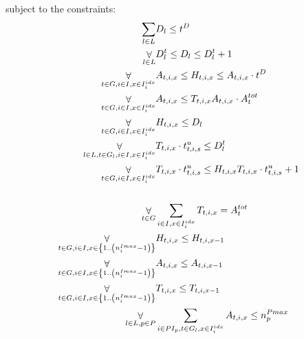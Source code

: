 {   subject to the constraints:
   \nopagebreak 
   \begin{align}
       \label{cLayerDeadline} \mathop\sum\limits_{l \in \LAYER} & \LayerDeadline_l \leq \workflowDeadline
       \\
       \label{cLayerTime}     \mathop\forall\limits_{l \in \LAYER} & \LayerTime_l \leq \LayerDeadline_l \leq \LayerTime_l + 1
       \\
       \label{cInstancesActiveHours} \mathop\forall\limits_{t \in \TASK, i \in \INSTANCE, x \in \instanceSet_i} & 
         \InstanceActive_{t,i,x} \leq \InstanceHours_{t,i,x} \leq  \InstanceActive_{t,i,x} \cdot \workflowDeadline
       \\
       \label{cInstancesActiveTasks} \mathop\forall\limits_{t \in \TASK, i \in \INSTANCE, x \in \instanceSet_i} &
         \InstanceActive_{t,i,x} \leq \InstanceTasks_{t,i,x} \InstanceActive_{t,i,x} \cdot \taskCount_t
       \\
       \label{cEnsureLayerDeadline} \mathop\forall\limits_{t \in \TASK, i \in \INSTANCE, x \in \instanceSet_i} &
         \InstanceHours_{t,i,x} \leq \LayerDeadline_l
       \\ 
       \label{cEnsureLayerTime} \mathop\forall\limits_{l \in \LAYER, t \in \TASK_l, i \in \INSTANCE, x \in \instanceSet_i} &
         \InstanceTasks_{t,i,x} \cdot \unitTime_{t,i,s} \leq \LayerTime_l
       \\       
       \label{cEnoughProcessingPower} \mathop\forall\limits_{t \in \TASK, i \in \INSTANCE, x \in \instanceSet_i} &
         \InstanceTasks_{t,i,x} \cdot \unitTime_{t,i,s} \leq \InstanceHours_{t,i,x} \InstanceTasks_{t,i,x} \cdot \unitTime_{t,i,s} + 1\\
       \\         
       \label{cProcessAllTasks} \mathop\forall\limits_{t \in \TASK} &
         \mathop\sum\limits_{i \in \INSTANCE, x \in \instanceSet_i} \InstanceTasks_{t,i,x} = \taskCount_t
       \\
       \label{cSymmetricSolutions1} \mathop\forall\limits_{t \in \TASK, i \in \INSTANCE, x \in \left\{1 .. \left(\instanceMaxMachines_i - 1\right)\right\}} & 
         \InstanceHours_{t,i,x} \leq \InstanceHours_{t,i,x-1} \\        
       \label{cSymmetricSolutions2} \mathop\forall\limits_{t \in \TASK, i \in \INSTANCE, x \in \left\{1 .. \left(\instanceMaxMachines_i - 1\right)\right\}} & 
         \InstanceActive_{t,i,x} \leq \InstanceActive_{t,i,x-1}\\ 
       \label{cSymmetricSolutions3} \mathop\forall\limits_{t \in \TASK, i \in \INSTANCE, x \in \left\{1 .. \left(\instanceMaxMachines_i - 1\right)\right\}} &
         \InstanceTasks_{t,i,x} \leq \InstanceTasks_{t,i,x-1}
       \\
       \label{cProviderLimits} \mathop\forall\limits_{l \in \LAYER, p \in \PROVIDER} &
         \mathop\sum\limits_{i \in \PROVIDERINSTANCES_p, t \in \TASK_l, x \in \instanceSet_i} \InstanceActive_{t,i,x} \leq \providerMaxMachines_p
    \end{align}
    
}
